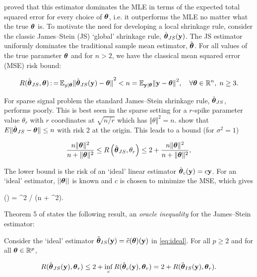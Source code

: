 \documentclass[sts,preprint]{imsart}
\begin{document}
\citet{james_estimation_1961} proved that this estimator dominates the MLE in terms of the expected total squared error for every choice of $\boldsymbol{\theta}$, i.e. it outperforms the MLE no matter what the true $\boldsymbol{\theta}$ is. To motivate the need for developing a local shrinkage rule, consider the classic James--Stein (JS) `global' shrinkage rule, ${\hat{\boldsymbol{\theta}}}_{JS}{}({\bf y})$. The JS estimator uniformly dominates the traditional sample mean estimator, $\hat{\boldsymbol{\theta}}$. For all values of the true parameter $\boldsymbol{\theta}$ and for $n>2$, we have the classical mean squared error (MSE) risk bound:

\[ 
  R({\hat{\boldsymbol{\theta}}}_{JS}{}, \boldsymbol{\theta}) \operatorname{:=} \mathbb E_{y \mid \boldsymbol{\theta}} {\Vert {\hat{\boldsymbol{\theta}}}_{JS}{}({\bf y}) - \boldsymbol{\theta}
  \Vert}^2 < n = \mathbb E_{{\bf y} \mid \boldsymbol{\theta}} {\Vert {\bf y} - \boldsymbol{\theta} \Vert}^2, \quad
  \forall \boldsymbol{\theta} \in \mathbb{R}^n, \; n \ge 3.  
\]

For sparse signal problem the standard James--Stein shrinkage rule, ${\hat{\boldsymbol{\theta}}}_{JS}{}$, performs poorly. This is best seen in the sparse setting for a $r$-spike parameter value $ \theta_r$ with $r$ coordinates at $
\sqrt{n/r} $ which has $ \Vert \theta \Vert^2 =n $. \citet{johnstone2004needles} show that $E \Vert {\hat{\boldsymbol{\theta}}}_{JS}{} - \boldsymbol{\theta} \Vert \leq n $ with risk $2$ at the origin. This leads to a bound (for $\sigma^2 = 1$)

\[
  \frac{n \Vert \boldsymbol{\theta} \Vert^2}{ n + \Vert \boldsymbol{\theta} \Vert^2} \leq R \left (
  {\hat{\boldsymbol{\theta}}}_{JS}{}, \theta_r \right ) \leq 2 + \frac{n \Vert \boldsymbol{\theta} \Vert^2}{ n
  + \Vert \boldsymbol{\theta} \Vert^2},
\]

The lower bound is the risk of an `ideal' linear estimator $\hat{\boldsymbol{\theta}}_c({\bf y}) = c{\bf y}$. For an `ideal' estimator, $\left|\left|\boldsymbol{\theta}\right|\right|$ is known and $c$ is chosen to minimize the MSE, which gives 

\beq 
{}(\btheta) = \vectornorm{\btheta}^2 / (n + \vectornorm{\btheta}^2). \label{eq:ideal}
\eeq

Theorem 5 of \cite{donoho1995adapting} states the following result, an \textit{oracle inequality} for the James--Stein estimator: 

\begin{lemma}
Consider the `ideal' estimator $\tilde{\boldsymbol{\theta}}_{IS}({\bf y}) = \tilde{c}(\boldsymbol{\theta})({\bf y})$ in \eqref{eq:ideal}. For all $p \ge 2$ and for all $\boldsymbol{\theta} \in \mathbb{R}^p$, 

\[
R({\hat{\boldsymbol{\theta}}}_{JS}{}({\bf y}), \boldsymbol{\theta}_r) \le 2 + \inf_c R(\hat{\boldsymbol{\theta}}_c({\bf y}), \boldsymbol{\theta}_r) = 2 + R(\tilde{\boldsymbol{\theta}}_{IS}({\bf y}), \boldsymbol{\theta}_r).
\]

\end{lemma}
\end{document}

